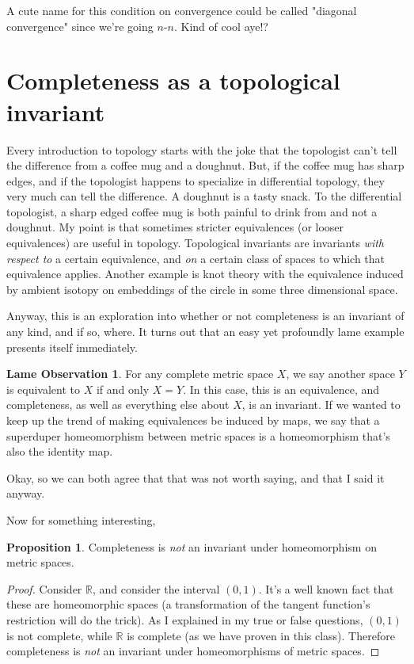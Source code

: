 \documentclass[11pt]{article}
\newcommand{\R}{\mathbb{R}}
\theoremstyle{definition}
\newtheorem{proposition}{Proposition}
\newtheorem{lameobservation}{Lame Observation}
\begin{document}
A cute name for this condition on convergence could be called "diagonal convergence" since we're going $n$-$n$. Kind of cool aye!?


\section{Completeness as a topological invariant}

Every introduction to topology starts with the joke that the topologist can't tell the difference from a coffee mug and a doughnut. But, if the coffee mug has sharp edges, and if the topologist happens to specialize in differential topology, they very much can tell the difference. A doughnut is a tasty snack. To the differential topologist, a sharp edged coffee mug is both painful to drink from and not a doughnut. My point is that sometimes stricter equivalences (or looser equivalences) are useful in topology. Topological invariants are invariants \textit{with respect to} a certain equivalence, and \textit{on} a certain class of spaces to which that equivalence applies. Another example is knot theory with the equivalence induced by ambient isotopy on embeddings of the circle in some three dimensional space.

Anyway, this is an exploration into whether or not completeness is an invariant of any kind, and if so, where. It turns out that an easy yet profoundly lame example presents itself immediately.

\begin{lameobservation}
For any complete metric space $X$, we say another space $Y$ is equivalent to $X$ if and only $X = Y$. In this case, this is an equivalence, and completeness, as well as everything else about $X$, is an invariant. If we wanted to keep up the trend of making equivalences be induced by maps, we say that a superduper homeomorphism between metric spaces is a homeomorphism that's also the identity map.
\end{lameobservation}

Okay, so we can both agree that that was not worth saying, and that I said it anyway.

Now for something interesting,

\begin{proposition}
Completeness is \textit{not} an invariant under homeomorphism on metric spaces.
\end{proposition}

\begin{proof}
Consider $\R$, and consider the interval $(0,1)$. It's a well known fact that these are homeomorphic spaces (a transformation of the tangent function's restriction will do the trick). As I explained in my true or false questions, $(0,1)$ is not complete, while $\R$ is complete (as we have proven in this class). Therefore completeness is \textit{not} an invariant under homeomorphisms of metric spaces.
\end{proof}
\end{document}
